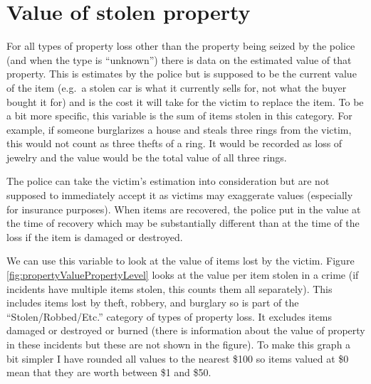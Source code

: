 \documentclass[
]{krantz}
\begin{document}
\section{Value of stolen
property}\label{value-of-stolen-property}

For all types of property loss other than the property being
seized by the police (and when the type is ``unknown'')
there is data on the estimated value of that property. This
is estimates by the police but is supposed to be the current
value of the item (e.g.~a stolen car is what it currently
sells for, not what the buyer bought it for) and is the cost
it will take for the victim to replace the item. To be a bit
more specific, this variable is the sum of items stolen in
this category. For example, if someone burglarizes a house
and steals three rings from the victim, this would not count
as three thefts of a ring. It would be recorded as loss of
jewelry and the value would be the total value of all three
rings.

The police can take the victim's estimation into
consideration but are not supposed to immediately accept it
as victims may exaggerate values (especially for insurance
purposes). When items are recovered, the police put in the
value at the time of recovery which may be substantially
different than at the time of the loss if the item is
damaged or destroyed.

We can use this variable to look at the value of items lost
by the victim. Figure \ref{fig:propertyValuePropertyLevel}
looks at the value per item stolen in a crime (if incidents
have multiple items stolen, this counts them all
separately). This includes items lost by theft, robbery, and
burglary so is part of the ``Stolen/Robbed/Etc.'' category
of types of property loss. It excludes items damaged or
destroyed or burned (there is information about the value of
property in these incidents but these are not shown in the
figure). To make this graph a bit simpler I have rounded all
values to the nearest \$100 so items valued at \$0 mean that
they are worth between \$1 and \$50.
\end{document}

